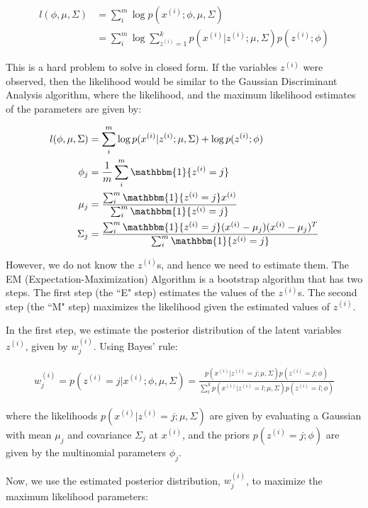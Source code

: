 \documentclass[letterpaper,10pt]{article}
\begin{document}
\begin{align}
l(\phi, \mu, \Sigma) &= \sum_i^m \log p(x^{(i)}; \phi, \mu, \Sigma) \\
&= \sum_i^m \log \sum_{z^{(i)}=1}^k p(x^{(i)} | z^{(i)}; \mu, \Sigma) p(z^{(i)};\phi)
\end{align}

This is a hard problem to solve in closed form. If the variables $z^{(i)}$ were observed, then the likelihood would be similar to the Gaussian Discriminant Analysis algorithm, where the likelihood, and the maximum likelihood estimates of the parameters are given by:

\begin{align}
l(\phi, \mu, \Sigma) &= \sum_i^m \log p(x^{(i)}|z^{(i)}; \mu, \Sigma) + \log p(z^{(i)};\phi) \\
\phi_j &= \frac{1}{m} \sum_i^m \mathbbm{1} \{z^{(i)} = j\} \\
\mu_j &= \frac{\sum_i^m \mathbbm{1} \{z^{(i)} = j\} x^{(i)} }{\sum_i^m \mathbbm{1} \{z^{(i)} = j\} } \\
\Sigma_j &= \frac{\sum_i^m \mathbbm{1} \{z^{(i)} = j\} (x^{(i)} - \mu_j) (x^{(i)} - \mu_j)^T }{\sum_i^m \mathbbm{1} \{z^{(i)} = j\} }
\end{align}

However, we do not know the $z^{(i)}$s, and hence we need to estimate them. The EM (Expectation-Maximization) Algorithm is a bootstrap algorithm that has two steps. The first step (the ``E" step) estimates the values of the $z^{(i)}$s. The second step (the ``M" step) maximizes the likelihood given the estimated values of $z^{(i)}$.

In the first step, we estimate the posterior distribution of the latent variables $z^{(i)}$, given by $w_j^{(i)}$. Using Bayes' rule:

\begin{align}
w_j^{(i)} = p(z^{(i)} = j | x^{(i)}; \phi, \mu, \Sigma) = \frac{p(x^{(i)} | z^{(i)}=j; \mu, \Sigma) p(z^{(i)}=j; \phi)}{\sum_l^k p(x^{(i)} | z^{(i)}=l; \mu, \Sigma) p(z^{(i)}=l; \phi)}
\end{align}

where the likelihoods $p(x^{(i)} | z^{(i)}=j; \mu, \Sigma)$ are given by evaluating a Gaussian with mean $\mu_j$ and covariance $\Sigma_j$ at $x^{(i)}$, and the priors $p(z^{(i)}=j; \phi)$ are given by the multinomial parameters $\phi_j$.

Now, we use the estimated posterior distribution, $w_j^{(i)}$, to maximize the maximum likelihood parameters:
\end{document}
